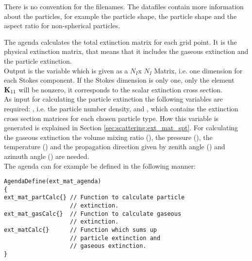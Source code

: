 There is no convention for the filenames. The datafiles contain more 
information about the particles, for example the particle shape, the
particle shape and the aspect ratio for non-spherical particles.


\label{sec:scattering:gen_atmprop}

\label{sec:scattering:gen_ext}

\label{sec:scattering:ext_mat_agenda}

The agenda  calculates the total extinction
matrix \ExtMat{}
for each grid point. It is the physical extinction matrix, that means
that it includes the gaseous extinction and the particle
extinction.\\
Output is the variable  which is given
as a $N_I$x $N_I$ Matrix, i.e. one dimension for each Stokes component. If the
Stokes dimension is only one, only the element ${\bf K}_{11}$ will be
nonzero, it corresponds to the scalar extinction cross section. \\
As input for calculating the particle extinction the following
variables are required:
, i.e. the particle number density, and 
, which contains the extinction cross section
matrices for each chosen particle type. How this variable is generated
is explained in Section \ref{sec:scattering:ext_mat_spt}. For calculating the
gaseous extinction the volume mixing ratio (), the
pressure (), the temperature  () and the
propagation direction given by zenith angle () and
azimuth angle () are needed.\\
The agenda can for example be defined in the following manner:

\begin{minipage}{0.9\hsize}
\begin{verbatim}
AgendaDefine(ext_mat_agenda)
{
ext_mat_partCalc{} // Function to calculate particle
                   // extinction.
ext_mat_gasCalc{}  // Function to calculate gaseous
                   // extinction. 
ext_matCalc{}      // Function which sums up
                   // particle extinction and 
                   // gaseous extinction.
}
\end{verbatim}
\end{minipage}

